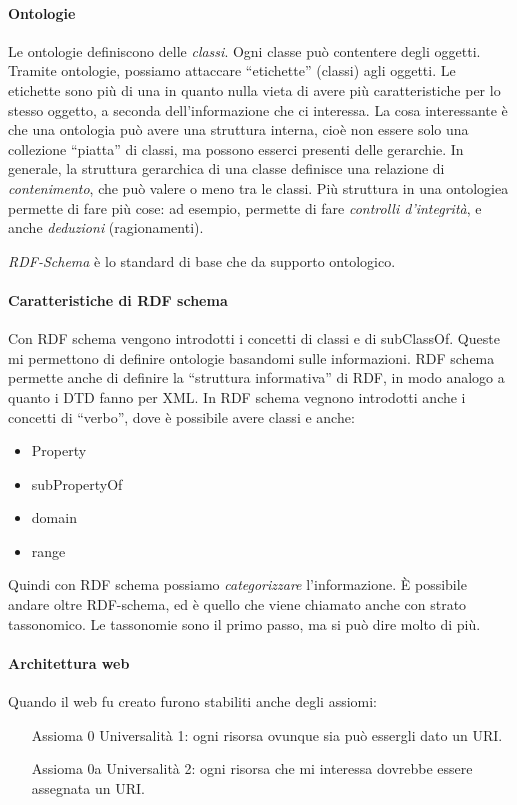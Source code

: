 \paragraph*{Ontologie}Le ontologie definiscono delle \textit{classi}. Ogni classe pu\`o contentere degli oggetti. Tramite ontologie, possiamo attaccare ``etichette'' (classi) agli oggetti. Le etichette sono pi\`u di una in quanto nulla vieta di avere pi\`u caratteristiche per lo stesso oggetto, a seconda dell'informazione che ci interessa. La cosa interessante \`e che una ontologia pu\`o avere una struttura interna, cio\`e non essere solo una collezione ``piatta'' di classi, ma possono esserci presenti delle gerarchie. In generale, la struttura gerarchica di una classe definisce una relazione di \textit{contenimento}, che pu\`o valere o meno tra le classi. Pi\`u struttura in una ontologiea permette di fare pi\`u cose: ad esempio, permette di fare \textit{controlli d'integrit\`a}, e anche \textit{deduzioni} (ragionamenti).

\textit{RDF-Schema} \`e lo standard di base che da supporto ontologico.

\paragraph*{Caratteristiche di RDF schema}Con RDF schema vengono introdotti i concetti di classi e di subClassOf. Queste mi permettono di definire ontologie basandomi sulle informazioni. RDF schema permette anche di definire la ``struttura informativa'' di RDF, in modo analogo a quanto i DTD fanno per XML. In RDF schema vegnono introdotti anche i concetti di ``verbo'', dove \`e possibile avere classi e anche:
\begin{itemize}

\item Property %
\item subPropertyOf
\item domain
\item range

\end{itemize}

Quindi con RDF schema possiamo \textit{categorizzare} l'informazione. \`E possibile andare oltre RDF-schema, ed \`e quello che viene chiamato anche con strato tassonomico. Le tassonomie sono il primo passo, ma si pu\`o dire molto di pi\`u.

\paragraph*{Architettura web}Quando il web fu creato furono stabiliti anche degli assiomi:
\begin{itemize}

\item[Assioma 0] Universalit\`a 1: ogni risorsa ovunque sia pu\`o essergli dato un URI.
\item[Assioma 0a] Universalit\`a 2: ogni risorsa che mi interessa dovrebbe essere assegnata un URI.
  

\end{itemize}

